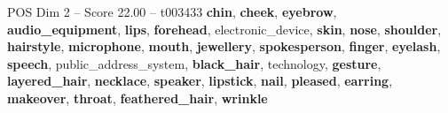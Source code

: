 \begin{textsample}{POS Dim 2 – Score 22.00 – t003433}  \label{ex:f2_pos_015}
\textbf{chin}, \textbf{cheek}, \textbf{eyebrow}, \textbf{audio\_equipment}, \textbf{lips}, \textbf{forehead}, electronic\_device, \textbf{skin}, \textbf{nose}, \textbf{shoulder}, \textbf{hairstyle}, \textbf{microphone}, \textbf{mouth}, \textbf{jewellery}, \textbf{spokesperson}, \textbf{finger}, \textbf{eyelash}, \textbf{speech}, public\_address\_system, \textbf{black\_hair}, technology, \textbf{gesture}, \textbf{layered\_hair}, \textbf{necklace}, \textbf{speaker}, \textbf{lipstick}, \textbf{nail}, \textbf{pleased}, \textbf{earring}, \textbf{makeover}, \textbf{throat}, \textbf{feathered\_hair}, \textbf{wrinkle}

\end{textsample}

